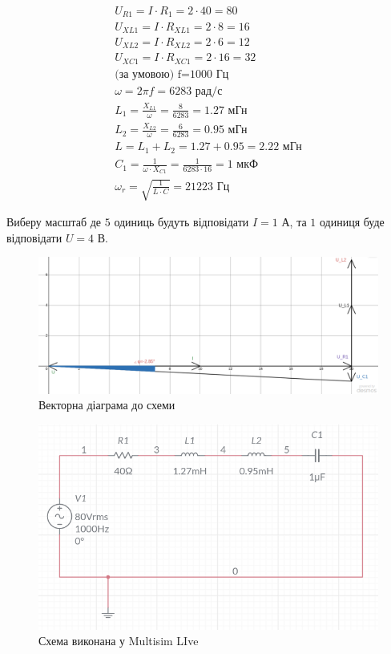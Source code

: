 \documentclass{article}
\begin{document}
\begin{normalsize}
	\begin{gather}
		U_{R1}=I\cdot R_1=2\cdot40=80\nonumber\\
		U_{XL1}=I\cdot R_{XL1}=2\cdot8=16\nonumber\\
		U_{XL2}=I\cdot R_{XL2}=2\cdot6=12\nonumber\\
		U_{XC1}=I\cdot R_{XC1}=2\cdot16=32\nonumber\\
		\text{(за умовою) f=1000 Гц}\nonumber\\
		\omega=2\pi f=\text{6283 рад/с}\nonumber\\
		L_1=\frac{X_{L1}}{\omega}=\frac{8}{6283}=\text{1.27 мГн}\nonumber\\
		L_2=\frac{X_{L2}}{\omega}=\frac{6}{6283}=\text{0.95 мГн}\nonumber\\
		L=L_1+L_2=1.27+0.95=\text{2.22 мГн}\nonumber\\
		C_1=\frac{1}{\omega\cdot X_{C1}}=\frac{1}{6283\cdot16}=\text{1 мкФ}\nonumber\\
		\omega_r=\sqrt{\frac{1}{L\cdot C}}=\text{21223 Гц}\nonumber
	\end{gather}

	Виберу масштаб де $5$ одиниць будуть відповідати $I=\text{1 А}$, та $1$ одиниця буде відповідати $U=\text{4 В}$.
	\begin{figure}[H]
		\centering
		\includegraphics[scale=0.35]{2}
		\caption{Векторна діаграма до схеми}
	\end{figure}

	\begin{figure}[H]
		\centering
		\includegraphics[scale=0.6]{1}
		\caption{Схема виконана у Multisim LIve}
	\end{figure}
	

\end{normalsize}
\end{document}
